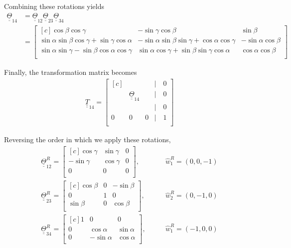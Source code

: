 \documentclass[onecolumn,10pt]{jhwhw}
\def\du#1{\underline{\underline{#1}}}
\begin{document}
Combining these rotations yields
\begin{align*}
\du{\Theta}_{14} &= \du{\Theta}_{12} \du{\Theta}_{23} \du{\Theta}_{34} \\
&=
\begin{bmatrix*}[c]
                                      \cos \beta \cos \gamma &                                        -\sin \gamma\cos \beta &              \sin \beta \\
 \sin \alpha \sin \beta \cos \gamma + \sin \gamma\cos \alpha & -\sin \alpha \sin \beta \sin \gamma + \cos \alpha \cos \gamma & -\sin \alpha \cos \beta \\
\sin \alpha \sin \gamma - \sin \beta \cos \alpha \cos \gamma &   \sin \alpha \cos \gamma + \sin \beta \sin \gamma\cos \alpha &  \cos \alpha \cos \beta \\
\end{bmatrix*}
\end{align*}

Finally, the transformation matrix becomes
\begin{align*}
\du{T}_{14} =
\begin{bmatrix*}[c]
& & & | \hspace{1em} 0 \\
& \du{\Theta}_{14} & & | \hspace{1em} 0 \\
& & & | \hspace{1em} 0 \\
0 & 0 & 0 & | \hspace{1em} 1 \\
\end{bmatrix*}
\end{align*}


Reversing the order in which we apply these rotations,
\begin{align*}
\du{\Theta}_{12}^{R} =
\begin{bmatrix*}[c]
\cos \gamma & \sin \gamma & 0 \\
-\sin \gamma & \cos \gamma & 0 \\
0 & 0 & 0\\
\end{bmatrix*},
\hspace{2em}&\hat{w}_1^R = \left ( 0, 0, -1 \right ) \\
\du{\Theta}_{23}^{R} =
\begin{bmatrix*}[c]
\cos \beta & 0 & -\sin \beta \\
0 & 1 & 0 \\
\sin \beta & 0 & \cos \beta \\
\end{bmatrix*},
\hspace{2em}&\hat{w}_2^R = \left ( 0, -1, 0 \right ) \\
\du{\Theta}_{34}^{R} =
\begin{bmatrix*}[c]
1 & 0 & 0 \\
0 & \cos \alpha & \sin \alpha \\
0 & -\sin \alpha & \cos \alpha \\
\end{bmatrix*},
\hspace{2em}&\hat{w}_1^R = \left ( -1, 0, 0 \right ) \\
\end{align*}
\end{document}
